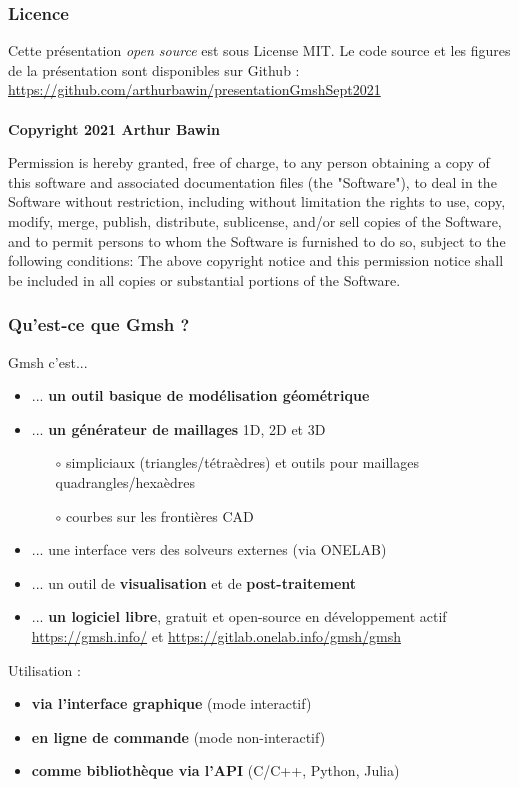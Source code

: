 \documentclass[aspectratio=169]{beamer}
\begin{document}
\frame{\titlepage}

\begin{frame}
\frametitle{Licence}
Cette présentation \textit{open source} est sous License MIT. Le code source et les figures de la présentation sont disponibles sur Github : \url{https://github.com/arthurbawin/presentationGmshSept2021} \\
~\\
\textbf{ Copyright 2021 Arthur Bawin}

\footnotesize{Permission is hereby granted, free of charge, to any person obtaining a copy of this software and associated documentation files (the "Software"), to deal in the Software without restriction, including without limitation the rights to use, copy, modify, merge, publish, distribute, sublicense, and/or sell copies of the Software, and to permit persons to whom the Software is furnished to do so, subject to the following conditions:
The above copyright notice and this permission notice shall be included in all copies or substantial portions of the Software.}
\end{frame}

\begin{frame}[fragile]
\frametitle{Qu'est-ce que Gmsh ?}
Gmsh c'est...
\vspace{-0.1cm}
\begin{itemize}
  \item ... \textbf{un outil basique de modélisation géométrique}
  \item ... \textbf{un générateur de maillages} 1D, 2D et 3D
  \begin{itemize}
    \item[$\circ$] simpliciaux (triangles/tétraèdres) et outils pour maillages quadrangles/hexaèdres
    \item[$\circ$] courbes sur les frontières CAD
  \end{itemize}
  \item ... une interface vers des solveurs externes (via ONELAB)
  \item ... un outil de \textbf{visualisation} et de \textbf{post-traitement}
  \item ... \textbf{un logiciel libre}, gratuit et open-source en développement actif\\
  \url{https://gmsh.info/} et \url{https://gitlab.onelab.info/gmsh/gmsh}
\end{itemize}
Utilisation :
\vspace{-0.1cm}
\begin{itemize}
  \item \textbf{via l'interface graphique} (mode interactif)
  \item \textbf{en ligne de commande} (mode non-interactif)
  \item \textbf{comme bibliothèque via l'API} (C/C++, Python, Julia)
\end{itemize}
\end{frame}
\end{document}
